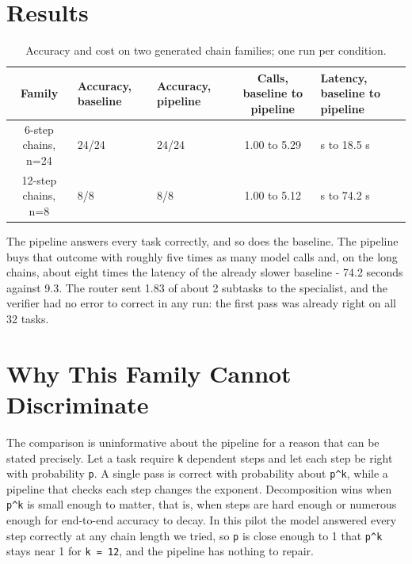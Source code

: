 \documentclass[runningheads,a4paper]{llncs}
\begin{document}
\section{Results}

\begin{table}[htbp]

\centering

\small

\caption{Accuracy and cost on two generated chain families; one run per condition.}\label{tab:1}

\begin{tabularx}{\textwidth}{@{}cXp{2.6cm}c>{\raggedright\arraybackslash}X@{}}

\toprule

\textbf{Family} & \textbf{Accuracy, baseline} & \textbf{Accuracy, pipeline} & \textbf{Calls, baseline to pipeline} & \textbf{Latency, baseline to pipeline} \\

\midrule

6-step chains, n=24 & 24/24 & 24/24 & 1.00 to 5.29 & 1.4 s to 18.5 s \\

12-step chains, n=8 & 8/8 & 8/8 & 1.00 to 5.12 & 9.3 s to 74.2 s \\

\bottomrule

\end{tabularx}

\end{table}

The pipeline answers every task correctly, and so does the baseline. The pipeline buys that outcome with roughly five times as many model calls and, on the long chains, about eight times the latency of the already slower baseline - 74.2 seconds against 9.3. The router sent 1.83 of about 2 subtasks to the specialist, and the verifier had no error to correct in any run: the first pass was already right on all 32 tasks.

\section{Why This Family Cannot Discriminate}

The comparison is uninformative about the pipeline for a reason that can be stated precisely. Let a task require \texttt{k} dependent steps and let each step be right with probability \texttt{p}. A single pass is correct with probability about \texttt{p\textasciicircum{}k}, while a pipeline that checks each step changes the exponent. Decomposition wins when \texttt{p\textasciicircum{}k} is small enough to matter, that is, when steps are hard enough or numerous enough for end-to-end accuracy to decay. In this pilot the model answered every step correctly at any chain length we tried, so \texttt{p} is close enough to 1 that \texttt{p\textasciicircum{}k} stays near 1 for \texttt{k = 12}, and the pipeline has nothing to repair.
\end{document}
